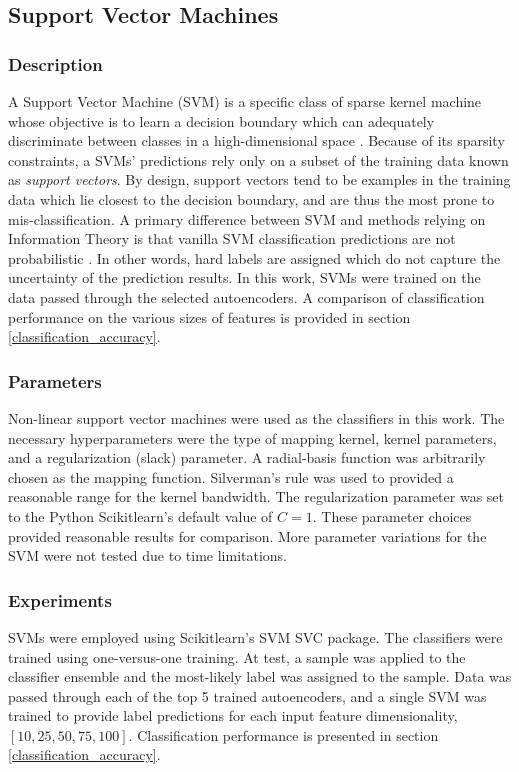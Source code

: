 \documentclass[conference]{IEEEtran}
\begin{document}
	 \subsection{Support Vector Machines}
	 \subsubsection*{Description}
	 A Support Vector Machine (SVM) is a specific class of sparse kernel machine whose objective  is to learn a decision boundary which can adequately discriminate between classes in a high-dimensional space \cite{Lin2011svm,Sanchez2011svm}.  Because of its sparsity constraints, a SVMs' predictions rely only on a subset of the training data known as \textit{support vectors}. By design, support vectors tend to be examples in the training data which lie closest to the decision boundary, and are thus the most prone to mis-classification. A primary difference between SVM and methods relying on Information Theory is that vanilla SVM classification predictions are not probabilistic \cite{Murphy2012Textbook}.  In other words, hard labels are assigned which do not capture the uncertainty of the prediction results.  In this work, SVMs were trained on the data passed through the selected autoencoders.  A comparison of classification performance on the various sizes of features is provided in section \ref{classification_accuracy}.
	 
	 \subsubsection*{Parameters}
	 Non-linear support vector machines were used as the classifiers in this work. The necessary hyperparameters were the type of mapping kernel,  kernel parameters, and a regularization (slack) parameter.  A radial-basis function was arbitrarily chosen as the mapping function.  Silverman's rule was used to provided a reasonable range for the kernel bandwidth. The regularization parameter was set to the Python Scikitlearn's default value of $C=1$.  These parameter choices provided reasonable results for comparison.  More parameter variations for the SVM were not tested due to time limitations.
	 
	 \subsubsection*{Experiments}
	 SVMs were employed using Scikitlearn's SVM SVC package.  The classifiers were trained using one-versus-one training.  At test, a sample was applied to the classifier ensemble and the most-likely label was assigned to the sample.  Data was passed through each of the top 5 trained autoencoders, and a single SVM was trained to provide label predictions for each input feature dimensionality, $[10,25,50,75,100]$.  Classification performance is presented in section \ref{classification_accuracy}. 
	 
\end{document}
